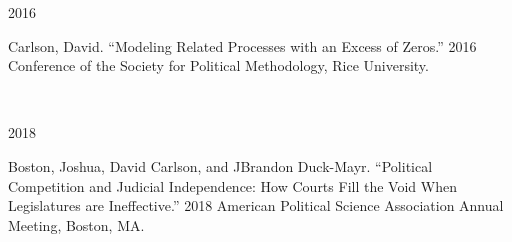 \documentclass[12pt]{article}
\begin{document}
\begin{minipage}[t]{.15\textwidth}
2016\\%
\end{minipage}
\begin{minipage}[t]{.8\textwidth}
\FlushLeft
Carlson, David. ``Modeling Related Processes with an Excess of Zeros.'' 2016 Conference of the Society for Political Methodology, Rice University.\\
\end{minipage}
\vspace{.5cm}




\\
\vspace{.2cm}


\begin{minipage}[t]{.15\textwidth}
2018\\
\end{minipage}
\begin{minipage}[t]{.8\textwidth}
\FlushLeft
Boston, Joshua, David Carlson, and JBrandon Duck-Mayr. ``Political Competition and Judicial Independence: How Courts Fill the Void When Legislatures are Ineffective.'' 2018 American Political Science Association Annual Meeting, Boston, MA.\\
\end{minipage}
\vspace{.35cm}
\end{document}
